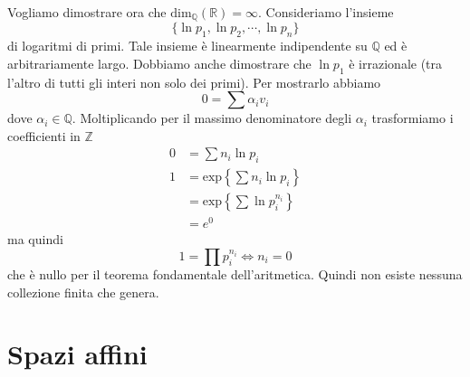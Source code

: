 \documentclass[a4paper]{article}
\begin{document}
Vogliamo dimostrare ora che \(\text{dim}_{\mathbb{Q}}(\mathbb{R}) = \infty\).
Consideriamo l'insieme
\[
    \{
        \ln p_1, \ln p_2, \cdots, \ln p_n    
    \}
\]
di logaritmi di primi. Tale insieme è linearmente indipendente su \(\mathbb{Q}\)
ed è arbitrariamente largo.
Dobbiamo anche dimostrare che \(\ln p_1\) è irrazionale (tra l'altro di tutti gli interi non solo dei primi).
Per mostrarlo abbiamo
\[
    0 = \sum \alpha_i v_i
\]
dove \(\alpha_i \in \mathbb{Q}\).
Moltiplicando per il massimo denominatore degli \(\alpha_i\)
trasformiamo i coefficienti in \(\mathbb{Z}\)
\begin{align*}
    0 &= \sum n_i \ln p_i \\
    1 &= \text{exp}\left\{
        \sum n_i \ln p_i
    \right\} \\
    &= \text{exp}\left\{
        \sum \ln p_i^{n_i}
    \right\} \\
    &= e^0
\end{align*}
ma quindi
\[
    1 = \prod p_i^{n_i} \iff n_i = 0
\]
che è nullo per il teorema fondamentale dell'aritmetica.
Quindi non esiste nessuna collezione finita che genera.

\pagebreak

\section{Spazi affini}

\end{document}
